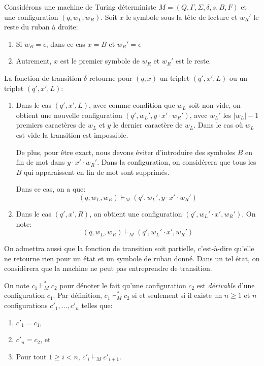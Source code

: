 Considérons une machine de Turing déterministe $M = (Q, \Gamma, \Sigma, \delta, s, B, F)$ et une configuration $(q, w_L, w_R)$.
Soit $x$ le symbole sous la tête de lecture et $w_R'$ le reste du ruban à droite:
\begin{enumerate}
\item Si $w_R = \epsilon$, dans ce cas $x = B$ et $w_R' = \epsilon$
\item Autrement, $x$ est le premier symbole de $w_R$ et $w_R'$ est le reste.
\end{enumerate}
La fonction de transition $\delta$ retourne pour $(q, x)$ un triplet $(q', x', L)$ ou un triplet $(q', x', L)$:
\begin{enumerate}
\item
Dans le cas $(q', x', L)$, avec comme condition que $w_L$ soit non vide, on obtient une nouvelle configuration $(q', w_L', y \cdot x' \cdot w_R')$, avec $w_L'$ les $|w_L| - 1$ premiers caractères de $w_L$ et $y$ le dernier caractère de $w_L$.
Dans le cas où $w_L$ est vide la transition est impossible.

De plus, pour être exact, nous devons éviter d'introduire des symboles $B$ en fin de mot dans $y \cdot x' \cdot w_R'$.
Dans la configuration, on considérera que tous les $B$ qui apparaissent en fin de mot sont supprimés.

Dans ce cas, on a que:
\[
(q, w_L, w_R) \vdash_M (q', w_L', y \cdot x' \cdot w_R')
\]

\item
Dans le cas $(q', x', R)$, on obtient une configuration $(q', w_L' \cdot x', w_R')$.
On note:
\[
(q, w_L, w_R) \vdash_M (q', w_L' \cdot x', w_R')
\]

\end{enumerate}
On admettra aussi que la fonction de transition soit partielle, c'est-à-dire qu'elle ne retourne rien pour un état et un symbole de ruban donné.
Dans un tel état, on considèrera que la machine ne peut pas entreprendre de transition.

On note $c_1 \vdash_M^* c_2$ pour dénoter le fait qu'une configuration $c_2$ est \og \textit{dérivable} \fg{} d'une configuration $c_1$.
Par définition, $c_1 \vdash_M^* c_2$ si et seulement si il existe un $n \geq 1$ et $n$ configurations $c'_1, \dots, c'_n$ telles que:
\begin{enumerate}
\item $c'_1 = c_1$,
\item $c'_n = c_2$, et
\item Pour tout $1 \geq i < n$, $c'_i \vdash_M c'_{i+1}$.
\end{enumerate}

